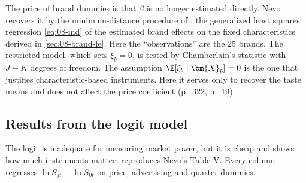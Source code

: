 The price of brand dummies is that $\beta$ is no longer estimated directly. Nevo recovers it by the
minimum-distance procedure of \citet{Chamberlain1982}, the generalized least squares regression \eqref{eq:08-md} of
the estimated brand effects on the fixed characteristics derived in \cref{sec:08-brand-fe}. Here the
``observations'' are the 25 brands. The restricted model, which sets $\xi_b = 0$, is tested by Chamberlain's
statistic with $J - K$ degrees of freedom. The assumption $\E[\xi_b\mid \bm{X}_b] = 0$ is the one that justifies
characteristic-based instruments. Here it serves only to recover the taste means and does not affect the price
coefficient (p.~322, n.~19).

\subsection{Results from the logit model}\label{sec:08-nevo01-logit}

The logit is inadequate for measuring market power, but it is cheap and shows how much instruments matter.
 reproduces Nevo's Table V. Every column regresses $\ln S_{jt} - \ln S_{0t}$ on price,
advertising and quarter dummies.

